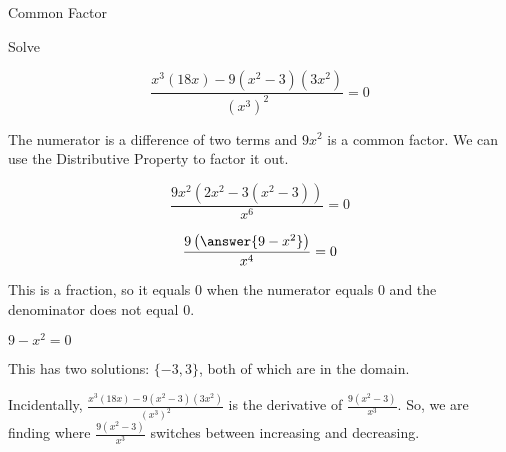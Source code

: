\documentclass{ximera}
\begin{document}
\begin{example}  Common Factor


Solve 

\[  \frac{x^3 (18x) - 9(x^2-3)(3x^2)}{(x^3)^2} = 0 \]



\begin{explanation}


The numerator is a difference of two terms and $9 x^2$ is a common factor.  We can use the Distributive Property to factor it out.



\[  \frac{9x^2 (2x^2 - 3(x^2-3))}{x^6} = 0  \]


\[  \frac{9 \left( \answer{9 - x^2} \right)}{x^4} = 0 \]



This is a fraction, so it equals $0$ when the numerator equals $0$ and the denominator does not equal $0$.


$9 - x^2 = 0$

This has two solutions: $\{ -3, 3  \}$, both of which are in the domain.






\end{explanation}

\end{example}





Incidentally, $\frac{x^3 (18x) - 9(x^2-3)(3x^2)}{(x^3)^2}$ is the derivative of $\frac{9(x^2-3)}{x^3}$.  So, we are finding where $\frac{9(x^2-3)}{x^3}$ switches between increasing and decreasing.
\end{document}
